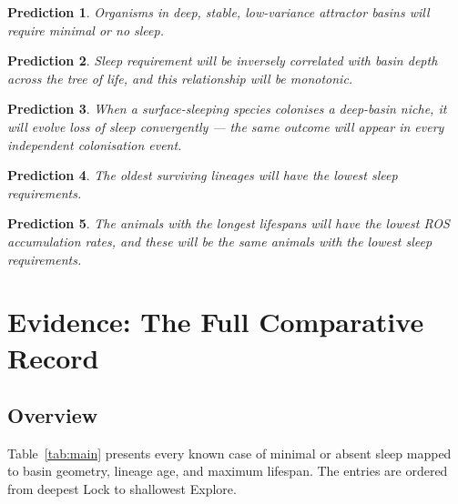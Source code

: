 \documentclass[12pt, a4paper]{article}
\newtheorem{prediction}{Prediction}
\begin{document}
\begin{prediction}
Organisms in deep, stable, low-variance attractor basins
will require minimal or no sleep.
\end{prediction}

\begin{prediction}
Sleep requirement will be inversely correlated with basin
depth across the tree of life, and this relationship will
be monotonic.
\end{prediction}

\begin{prediction}
When a surface-sleeping species colonises a deep-basin niche,
it will evolve loss of sleep convergently --- the same outcome
will appear in every independent colonisation event.
\end{prediction}

\begin{prediction}
The oldest surviving lineages will have the lowest sleep
requirements.
\end{prediction}

\begin{prediction}
The animals with the longest lifespans will have the lowest
ROS accumulation rates, and these will be the same animals
with the lowest sleep requirements.
\end{prediction}

\section{Evidence: The Full Comparative Record}
\label{sec:evidence}

\subsection{Overview}

Table~\ref{tab:main} presents every known case of minimal or
absent sleep mapped to basin geometry, lineage age, and
maximum lifespan. The entries are ordered from deepest Lock
to shallowest Explore.
\end{document}
